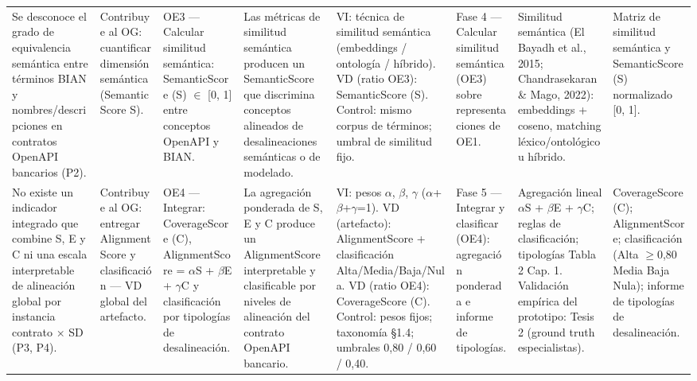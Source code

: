 \documentclass[10pt,landscape]{article}
\begin{document}
\begin{longtable}{@{} P{0.117\textwidth} P{0.117\textwidth} P{0.117\textwidth} P{0.117\textwidth} P{0.117\textwidth} P{0.117\textwidth} P{0.117\textwidth} P{0.117\textwidth} @{}}
 Se desconoce el grado de equivalencia semántica entre términos BIAN y nombres/descripciones en contratos OpenAPI bancarios (P2). & Contribuye al OG: cuantificar dimensión semántica (SemanticScore S). & OE3 — Calcular similitud semántica: SemanticScore (S) $\in$ [0, 1] entre conceptos OpenAPI y BIAN. & Las métricas de similitud semántica producen un SemanticScore que discrimina conceptos alineados de desalineaciones semánticas o de modelado. & VI: técnica de similitud semántica (embeddings / ontología / híbrido). VD (ratio OE3): SemanticScore (S). Control: mismo corpus de términos; umbral de similitud fijo. & Fase 4 — Calcular similitud semántica (OE3) sobre representaciones de OE1. & Similitud semántica (El Bayadh et al., 2015; Chandrasekaran \& Mago, 2022): embeddings + coseno, matching léxico/ontológico u híbrido. & Matriz de similitud semántica y SemanticScore (S) normalizado [0, 1]. \\
No existe un indicador integrado que combine S, E y C ni una escala interpretable de alineación global por instancia contrato × SD (P3, P4). & Contribuye al OG: entregar AlignmentScore y clasificación — VD global del artefacto. & OE4 — Integrar: CoverageScore (C), AlignmentScore = $\alpha$\textbullet{}S + $\beta$\textbullet{}E + $\gamma$\textbullet{}C y clasificación por tipologías de desalineación. & La agregación ponderada de S, E y C produce un AlignmentScore interpretable y clasificable por niveles de alineación del contrato OpenAPI bancario. & VI: pesos $\alpha$, $\beta$, $\gamma$ ($\alpha$+$\beta$+$\gamma$=1). VD (artefacto): AlignmentScore + clasificación Alta/Media/Baja/Nula. VD (ratio OE4): CoverageScore (C). Control: pesos fijos; taxonomía §1.4; umbrales 0,80 / 0,60 / 0,40. & Fase 5 — Integrar y clasificar (OE4): agregación ponderada e informe de tipologías. & Agregación lineal $\alpha$\textbullet{}S + $\beta$\textbullet{}E + $\gamma$\textbullet{}C; reglas de clasificación; tipologías Tabla 2 Cap. 1. Validación empírica del prototipo: Tesis 2 (ground truth especialistas). & CoverageScore (C); AlignmentScore; clasificación (Alta $\geq$0,80 \textbullet{} Media \textbullet{} Baja \textbullet{} Nula); informe de tipologías de desalineación. \\
\end{longtable}
\normalsize
\end{document}
